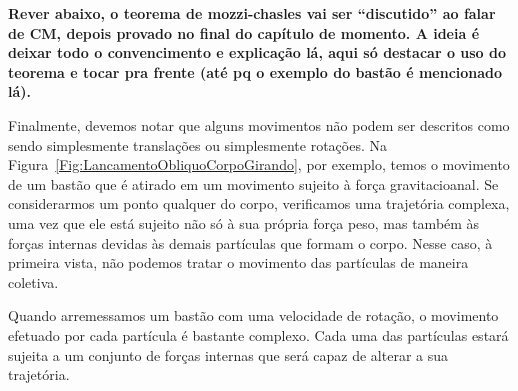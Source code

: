 \textbf{Rever abaixo, o teorema de mozzi-chasles vai ser ``discutido'' ao falar de CM, depois provado no final do capítulo de momento. A ideia é deixar todo o convencimento e explicação lá, aqui só destacar o uso do teorema e tocar pra frente (até pq o exemplo do bastão é mencionado lá).}

Finalmente, devemos notar que alguns movimentos não podem ser descritos como sendo simplesmente translações ou simplesmente rotações. Na  Figura~\ref{Fig:LancamentoObliquoCorpoGirando}, por exemplo, temos o movimento de um bastão que é atirado em um movimento sujeito à força gravitacioanal. Se considerarmos um ponto qualquer do corpo, verificamos uma trajetória complexa, uma vez que ele está sujeito não só à sua própria força peso, mas também às forças internas devidas às demais partículas que formam o corpo. Nesse caso, à primeira vista, não podemos tratar o movimento das partículas de maneira coletiva.

\begin{marginfigure}
\centering
{}
\caption{Quando arremessamos um bastão com uma velocidade de rotação, o movimento efetuado por cada partícula é bastante complexo. Cada uma das partículas estará sujeita a um conjunto de forças internas que será capaz de alterar a sua trajetória. \label{Fig:LancamentoObliquoCorpoGirando}}
\end{marginfigure}

